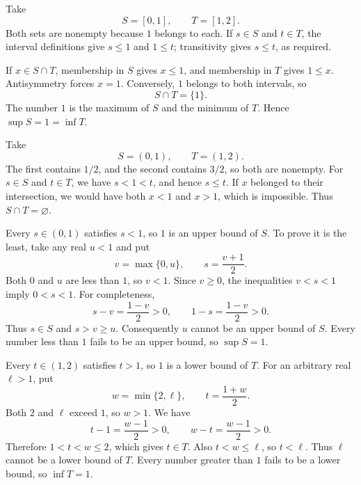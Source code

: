
Take
\[
 S=[0,1],\qquad T=[1,2].
\]
Both sets are nonempty because $1$ belongs to each. If $s\in S$ and
$t\in T$, the interval definitions give $s\le1$ and $1\le t$;
transitivity gives $s\le t$, as required.

If $x\in S\cap T$, membership in $S$ gives $x\le1$, and membership
in $T$ gives $1\le x$. Antisymmetry forces $x=1$. Conversely, $1$
belongs to both intervals, so
\[
 S\cap T=\{1\}.
\]
The number $1$ is the maximum of $S$ and the minimum of $T$.
Hence $\sup S=1=\inf T$.


Take
\[
 S=(0,1),\qquad T=(1,2).
\]
The first contains $1/2$, and the second contains $3/2$, so both are
nonempty. For $s\in S$ and $t\in T$, we have $s<1<t$, and hence
$s\le t$. If $x$ belonged to their intersection, we would have both
$x<1$ and $x>1$, which is impossible. Thus $S\cap T=\varnothing$.

Every $s\in(0,1)$ satisfies $s<1$, so $1$ is an upper bound of $S$.
To prove it is the least, take any real $u<1$ and put
\[
 v=\max\{0,u\},\qquad s=\frac{v+1}{2}.
\]
Both $0$ and $u$ are less than $1$, so $v<1$. Since $v\ge0$,
the inequalities $v<s<1$ imply $0<s<1$. For completeness,
\[
 s-v=\frac{1-v}{2}>0,\qquad 1-s=\frac{1-v}{2}>0.
\]
Thus $s\in S$ and $s>v\ge u$. Consequently $u$ cannot be an upper
bound of $S$. Every number less than $1$ fails to be an upper bound,
so $\sup S=1$.

Every $t\in(1,2)$ satisfies $t>1$, so $1$ is a lower bound of $T$.
For an arbitrary real $\ell>1$, put
\[
 w=\min\{2,\ell\},\qquad t=\frac{1+w}{2}.
\]
Both $2$ and $\ell$ exceed $1$, so $w>1$. We have
\[
 t-1=\frac{w-1}{2}>0,\qquad w-t=\frac{w-1}{2}>0.
\]
Therefore $1<t<w\le2$, which gives $t\in T$. Also $t<w\le\ell$,
so $t<\ell$. Thus $\ell$ cannot be a lower bound of $T$.
Every number greater than $1$ fails to be a lower bound, so $\inf T=1$.


